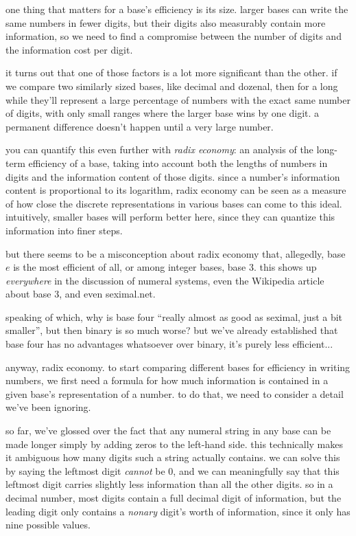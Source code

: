 \documentclass[../best.tex]{subfiles}
\begin{document}

one thing that matters for a base's efficiency is its size. larger bases can write the same numbers in fewer digits, but their digits also measurably contain more information, so we need to find a compromise between the number of digits and the information cost per digit.

it turns out that one of those factors is a lot more significant than the other. if we compare two similarly sized bases, like decimal and dozenal, then for a long while they'll represent a large percentage of numbers with the exact same number of digits, with only small ranges where the larger base wins by one digit. a permanent difference doesn't happen until a very large number.\myfootnote{}

you can quantify this even further with {\it radix economy}: an analysis of the long-term efficiency of a base, taking into account both the lengths of numbers in digits and the information content of those digits. since a number's information content is proportional to its logarithm,\myfootnote{} radix economy can be seen as a measure of how close the discrete representations in various bases can come to this ideal. intuitively, smaller bases will perform better here, since they can quantize this information into finer steps.

but there seems to be a misconception about radix economy that, allegedly, base $e$ is the most efficient of all, or among integer bases, base 3.\myfootnote{} this shows up \emph{everywhere} in the discussion of numeral systems, even the Wikipedia article about base 3, and even seximal.net.\myfootnote{}

speaking of which, why is base four ``really almost as good as seximal, just a bit smaller'', but then binary is so much worse? but we've already established that base four has no advantages whatsoever over binary, it's purely less efficient...

anyway, radix economy. to start comparing different bases for efficiency in writing numbers, we first need a formula for how much information is contained in a given base's representation of a number. to do that, we need to consider a detail we've been ignoring.

so far, we've glossed over the fact that any numeral string in any base can be made longer simply by adding zeros to the left-hand side. this technically makes it ambiguous how many digits such a string actually contains. we can solve this by saying the leftmost digit \emph{cannot} be 0, and we can meaningfully say that this leftmost digit carries slightly less information than all the other digits. so in a decimal number, most digits contain a full decimal digit of information, but the leading digit only contains a \emph{nonary} digit's worth of information, since it only has nine possible values.\myfootnote{}
\end{document}
